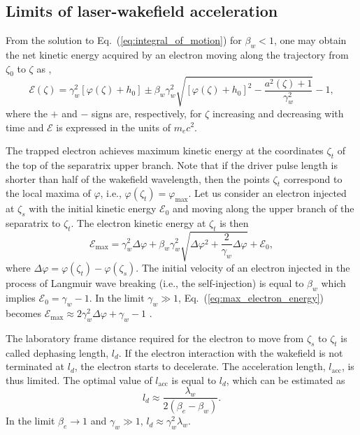 \documentclass[10pt, a4paper, twoside, openright]{report}
\begin{document}
\subsection{Limits of laser-wakefield acceleration}

From the solution to Eq.~(\ref{eq:integral_of_motion}) for $ \beta_w < 1 $, one may obtain the net kinetic energy acquired by an electron moving along the trajectory from $ \zeta_0 $ to $ \zeta $ as \cite{Esirkepov2006, Bulanov2013, Bulanov2021},
\begin{equation}\label{eq:electron_energy}
	\mathcal{E} \left( \zeta \right) = \gamma_w^2 \left[ \varphi \left( \zeta \right) + h_0 \right] \pm \beta_w \gamma_w^2 \sqrt{ \left[ \varphi \left( \zeta \right) + h_0 \right]^2 - \frac{a^2 \left( \zeta \right) + 1}{\gamma_w^2}} - 1,
\end{equation}
where the $ + $ and $ - $ signs are, respectively, for $ \zeta $ increasing and decreasing with time and $ \mathcal{E} $ is expressed in the units of $ m_e c^2 $.

The trapped electron achieves maximum kinetic energy at the coordinates $ \zeta_t $ of the top of the separatrix upper branch. Note that if the driver pulse length is shorter than half of the wakefield wavelength, then the points $ \zeta_t $ correspond to the local maxima of $ \varphi $, i.e., $ \varphi \left( \zeta_t \right) = \varphi_{\mathrm{max}} $. Let us consider an electron injected at $ \zeta_s $ with the initial kinetic energy $ \mathcal{E}_0 $ and moving along the upper branch of the separatrix to $ \zeta_t $. The electron kinetic energy at $ \zeta_t $ is then \cite{Esirkepov2006, Bulanov2013, Bulanov2021}
\begin{equation}\label{eq:max_electron_energy}
	\mathcal{E}_{\mathrm{max}} = \gamma_w^2 \Delta \varphi + \beta_w \gamma_w^2 \sqrt{ \Delta \varphi^2 + \frac{2}{\gamma_w} \Delta \varphi } + \mathcal{E}_0,
\end{equation}
where $ \Delta \varphi = \varphi \left( \zeta_t \right) - \varphi \left( \zeta_s \right) $. The initial velocity of an electron injected in the process of Langmuir wave breaking (i.e., the self-injection) is equal to $ \beta_w $ which implies $ \mathcal{E}_0 = \gamma_w - 1 $. In the limit $ \gamma_w \gg 1 $, Eq.~(\ref{eq:max_electron_energy}) becomes $ \mathcal{E}_{\mathrm{max}} \approx 2 \gamma_w^2 \Delta \varphi + \gamma_w - 1 $ \cite{Esirkepov2006, Bulanov2013}.

The laboratory frame distance required for the electron to move from $ \zeta_s $ to $ \zeta_t $ is called dephasing length, $ l_d $. If the electron interaction with the wakefield is not terminated at $ l_d $, the electron starts to decelerate. The acceleration length, $ l_{\mathrm{acc}} $, is thus limited. The optimal value of $ l_{\mathrm{acc}} $ is equal to $ l_d $, which can be estimated as \cite{Esarey2009}
\begin{equation}\label{eq:dephasing_length}
	l_d \approx \frac{\lambda_w}{2 \left( \beta_e - \beta_w \right)}.
\end{equation}
In the limit $ \beta_e \rightarrow 1 $ and $ \gamma_w \gg 1 $, $ l_d \approx \gamma_w^2 \lambda_w $.
\end{document}
